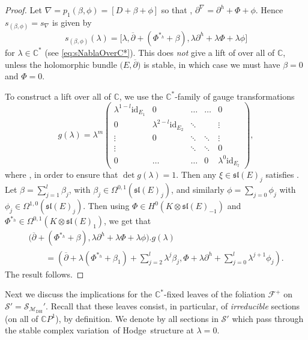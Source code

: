 \documentclass[pdftex]{sigma}
\numberwithin{equation}{section}
\theoremstyle{definition}
\newcommand\C{{\mathbb C}}
\begin{document}
\begin{proof}
Let
$\nabla = p_1(\beta, \phi) = [D+\beta+\phi]$
so that
, $ \partial^\nabla = \partial^h + \Phi + \phi$.
Hence $s_{(\beta, \phi)} = s_\nabla$ is given by
\[%
s_{(\beta,\phi)}(\lambda) = \big[\lambda, {\overline{\partial}}+(\Phi^{*_h}+\beta) ,
 \lambda \partial^h+\lambda\Phi+\lambda \phi \big]
\]
for $\lambda \in \C^*$ (see \eqref{eq:sNablaOverC*}).
This does \emph{not} give a lift of  over all of $\C$, unless the
holomorphic bundle $\bigl(E, {\overline{\partial}}\bigr)$ is stable, in which case we must have $\beta = 0$ and
$\Phi = 0$.

To construct a lift over all of $\C$, we use the $\C^*$-family of gauge transformations
\begin{equation}\label{Eq: glambdaVHS}
g(\lambda) = \lambda^{m}\begin{pmatrix}
\lambda^{1-l}\mathrm{id}_{E_1} & 0 &\dots & \dots & 0\\
0 & \lambda^{2-l}\mathrm{id}_{E_2} & \ddots & & \vdots\\
\vdots &0& \ddots & \ddots & \vdots\\
\vdots & & \ddots &\ddots & 0\\
0 & \dots & \dots & 0 & \lambda^0\mathrm{id}_{E_l}
\end{pmatrix},
\end{equation}
where , in order to ensure
that $\det g(\lambda) = 1$. Then any $\xi \in \mathfrak{sl}(E)_j$ satisfies
.
Let $\beta = \sum_{j=1}^l\beta_j$, with $\beta_j \in \Omega^{0,1}(\mathfrak{sl}(E)_j)$, and similarly
$\phi = \sum_{j=0}\phi_j$ with $\phi_j \in \Omega^{1,0}(\mathfrak{sl}(E)_j)$.
Then using $\Phi \in H^0(K\otimes\mathfrak{sl}(E)_{-1})$ and $\Phi^{*_h} \in
\Omega^{0,1}(K\otimes\mathfrak{sl}(E)_1)$, we get that
\begin{gather*}
\bigl({\overline{\partial}}+(\Phi^{*_h}+\beta) , \lambda \partial^h+\lambda\Phi+\lambda \phi\bigr).g(\lambda)\\
 \qquad= \left({\overline{\partial}} + \lambda(\Phi^{*_h}+\beta_1) + \sum_{j=2}^l\lambda^j\beta_j,
\Phi + \lambda\partial^h + \sum_{j=0}^l\lambda^{j+1}\phi_j\right).
\end{gather*}
The result follows.
\end{proof}

Next we discuss the implications for the $\C^*$-fixed leaves of the foliation $\mathcal{F}^+$
on $\mathcal{S}' = \mathcal{S}_{\mathcal{M}_{\mathrm{DH}}}'$. Recall that these leaves consist, in particular, of
\emph{irreducible} sections \big(on all of $\C P^1$\big), by de\-finition. We denote by
 all sections in $\mathcal{S}'$ which pass through the stable
complex variation~of Hodge~structure \smash{$\bigl({\overline{\partial}}, \Phi\bigr) \in \mathcal{M}_{\mathrm{Higgs}}^{\C^*}$} at $\lambda = 0$.
\end{document}
